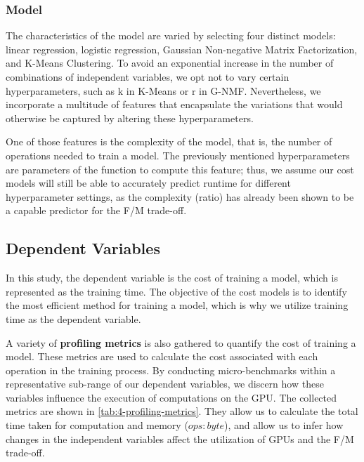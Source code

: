 \subsubsection{Model}
The characteristics of the model are varied by selecting four distinct models: linear regression, logistic regression, Gaussian Non-negative Matrix Factorization, and K-Means Clustering. To avoid an exponential increase in the number of combinations of independent variables, we opt not to vary certain hyperparameters, such as k in K-Means or r in G-NMF. Nevertheless, we incorporate a multitude of features that encapsulate the variations that would otherwise be captured by altering these hyperparameters.

One of those features is the complexity of the model, that is, the number of operations needed to train a model. The previously mentioned hyperparameters are parameters of the function to compute this feature; thus, we assume our cost models will still be able to accurately predict runtime for different hyperparameter settings, as the complexity (ratio) has already been shown to be a capable predictor for the F/M trade-off.

\subsection{Dependent Variables}
In this study, the dependent variable is the cost of training a model, which is represented as the training time. The objective of the cost models is to identify the most efficient method for training a model, which is why we utilize training time as the dependent variable.

A variety of \textbf{profiling metrics} is also gathered to quantify the cost of training a model. These metrics are used to calculate the cost associated with each operation in the training process. By conducting micro-benchmarks within a representative sub-range of our dependent variables, we discern how these variables influence the execution of computations on the GPU. The collected metrics are shown in \autoref{tab:4-profiling-metrics}. They allow us to calculate the total time taken for computation and memory ($ops:byte$), and allow us to infer how changes in the independent variables affect the utilization of GPUs and the F/M trade-off.


